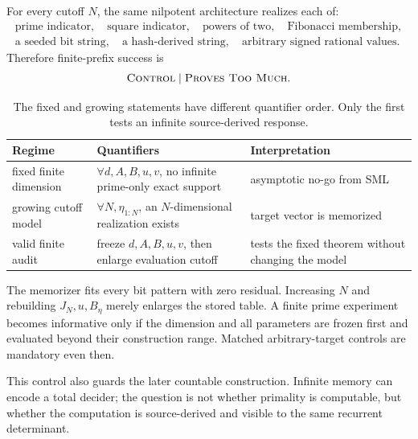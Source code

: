 \begin{corollary}
\label{cor:provestoomuch}
For every cutoff \(N\), the same nilpotent architecture realizes each of:
\[
\begin{array}{c}
\text{prime indicator},\quad
\text{square indicator},\quad
\text{powers of two},\quad
\text{Fibonacci membership},\\
\text{a seeded bit string},\quad
\text{a hash-derived string},\quad
\text{arbitrary signed rational values}.
\end{array}
\]
Therefore finite-prefix success is
\[
        \text{\normalfont\scshape Control}
        \mid
        \text{\normalfont\scshape Proves Too Much}.
\]
\end{corollary}

\begin{table}[t]
\centering
\caption{The fixed and growing statements have different quantifier order.
Only the first tests an infinite source-derived response.}
\label{tab:quantifiers}
\small
\begin{tabularx}{\textwidth}{L{3.1cm}YY}
\toprule
Regime & Quantifiers & Interpretation \\
\midrule
fixed finite dimension
& \(\forall d,A,B,u,v\), no infinite prime-only exact support
& asymptotic no-go from SML \\
growing cutoff model
& \(\forall N,\eta_{1:N}\), an \(N\)-dimensional realization exists
& target vector is memorized \\
valid finite audit
& freeze \(d,A,B,u,v\), then enlarge evaluation cutoff
& tests the fixed theorem without changing the model \\
\bottomrule
\end{tabularx}
\end{table}

\begin{remark}
The memorizer fits every bit pattern with zero residual.  Increasing \(N\)
and rebuilding \(J_N,u,B_\eta\) merely enlarges the stored table.  A finite
prime experiment becomes informative only if the dimension and all
parameters are frozen first and evaluated beyond their construction range.
Matched arbitrary-target controls are mandatory even then.
\end{remark}

This control also guards the later countable construction.  Infinite memory
can encode a total decider; the question is not whether primality is
computable, but whether the computation is source-derived and visible to
the same recurrent determinant.
